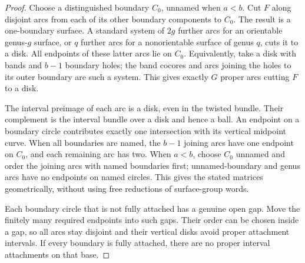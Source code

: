 \begin{proof}
Choose a distinguished boundary $C_0$, unnamed when $a<b$. Cut $F$ along
disjoint arcs from each of its other boundary components to $C_0$. The
result is a one-boundary surface. A standard system of $2g$ further arcs
for an orientable genus-$g$ surface, or $q$ further arcs for a nonorientable
surface of genus $q$, cuts it to a disk. All endpoints of these latter arcs
lie on $C_0$. Equivalently, take a disk with bands and $b-1$ boundary holes;
the band cocores and arcs joining the holes to its outer boundary are such
a system. This gives exactly $G$ proper arcs cutting $F$ to a disk.

The interval preimage of each arc is a disk, even in the twisted bundle.
Their complement is the interval bundle over a disk and hence a ball.
An endpoint on a boundary circle contributes exactly one intersection with
its vertical midpoint curve. When all boundaries are named, the $b-1$
joining arcs have one endpoint on $C_0$, and each remaining arc has two.
When $a<b$, choose $C_0$ unnamed and order the joining arcs with named
boundaries first; unnamed-boundary and genus arcs have no endpoints on
named circles. This gives the stated matrices geometrically, without using
free reductions of surface-group words.

Each boundary circle that is not fully attached has a genuine open gap.
Move the finitely many required endpoints into such gaps. Their order can
be chosen inside a gap, so all arcs stay disjoint and their vertical disks
avoid proper attachment intervals. If every boundary is fully attached,
there are no proper interval attachments on that base.
\end{proof}

